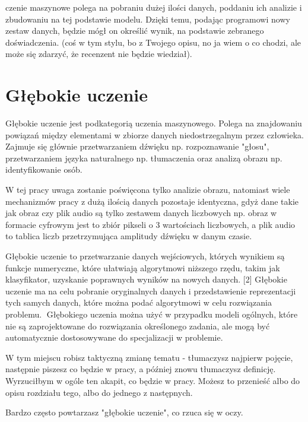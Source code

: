 \documentclass[brudnopis]{xmgr}
\begin{document}
czenie maszynowe polega na pobraniu dużej ilości danych, poddaniu ich analizie i zbudowaniu na tej podstawie modelu. Dzięki temu, podając programowi nowy zestaw danych, będzie mógł on określić wynik, na podstawie zebranego doświadczenia. (coś w tym stylu, bo z Twojego opisu, no ja wiem o co chodzi, ale może się zdarzyć, że recenzent nie będzie wiedział).

\section{Głębokie uczenie }

Głębokie uczenie jest podkategorią uczenia maszynowego. Polega na znajdowaniu powiązań między elementami w zbiorze danych niedostrzegalnym przez człowieka. Zajmuje się głównie przetwarzaniem dźwięku np. rozpoznawanie "głosu", przetwarzaniem języka naturalnego np. tłumaczenia oraz analizą obrazu np. identyfikowanie osób.



W tej pracy uwaga zostanie poświęcona tylko analizie obrazu, natomiast wiele mechanizmów pracy z dużą ilością danych pozostaje identyczna, gdyż dane takie jak obraz czy plik audio są tylko zestawem danych liczbowych np. obraz w formacie cyfrowym jest to zbiór pikseli o 3 wartościach liczbowych, a plik audio to tablica liczb przetrzymująca amplitudy dźwięku w danym czasie.

Głębokie uczenie to przetwarzanie danych wejściowych, których wynikiem są funkcje numeryczne, które ułatwiają algorytmowi niższego rzędu, takim jak klasyfikator, uzyskanie poprawnych wyników na nowych danych. [2] Głębokie uczenie ma na celu pobranie oryginalnych danych i przedstawienie reprezentacji tych samych danych, które można podać algorytmowi w celu rozwiązania problemu. 
􏰁Głębokiego uczenia można użyć w przypadku modeli ogólnych, które nie są zaprojektowane do rozwiązania określonego zadania, ale mogą być automatycznie dostosowywane do specjalizacji w problemie.

W tym miejscu robisz taktyczną zmianę tematu - tłumaczysz najpierw pojęcie, następnie piszesz co będzie w pracy, a później znowu tłumaczysz definicję. Wyrzuciłbym w ogóle ten akapit, co będzie w pracy. Możesz to przenieść albo do opisu rozdziału tego, albo do jednego z następnych.

Bardzo często powtarzasz "głębokie uczenie", co rzuca się w oczy.
\end{document}
